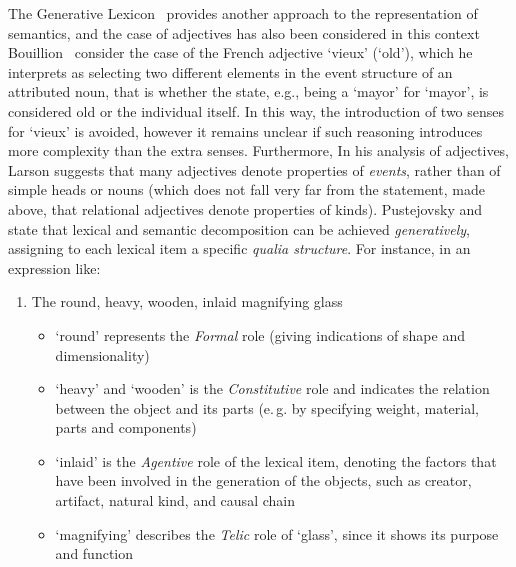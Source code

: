 \documentclass[11pt]{article}
\begin{document}
The Generative Lexicon~\cite{pustejovsky1991generative} provides another approach to the representation of semantics, and the case of adjectives has also been considered in this context Bouillion~ consider the case of the French adjective `vieux' (`old'), which he interprets as selecting two different
elements in the event structure of an attributed noun, that is whether the
state, e.g., being a `mayor' for `mayor', is considered old or the individual
itself. In this way, the introduction of two senses for `vieux' is avoided, 
however it remains unclear if such reasoning introduces more complexity than
the extra senses. %
Furthermore, In his analysis of adjectives, Larson  suggests that many adjectives denote properties of \textit{events}, rather than of simple heads or nouns (which does not fall very far from the statement, made above, that relational adjectives denote properties of kinds). Pustejovsky  and \cite{lenci2000qualia} state that lexical and semantic decomposition can be achieved \textit{generatively}, assigning to each lexical item a specific \textit{qualia structure}. For instance, in an expression like:

\begin{enumerate}
\item The round, heavy, wooden, inlaid magnifying glass \label{ex:qualia}
\begin{itemize}[noitemsep]
\item `round' represents the \textit{Formal} role (giving indications of shape and dimensionality)
\item `heavy' and `wooden' is the \textit{Constitutive} role and indicates the relation between the object and its parts (e.\,g. by specifying weight, material, parts and components)
\item `inlaid' is the \textit{Agentive} role of the lexical item, denoting the factors that have been involved in the generation of the objects, such as creator, artifact, natural kind, and causal chain
\item `magnifying' describes the \textit{Telic} role of `glass', since it shows its purpose and function
\end{itemize}
\end{enumerate}
\end{document}
